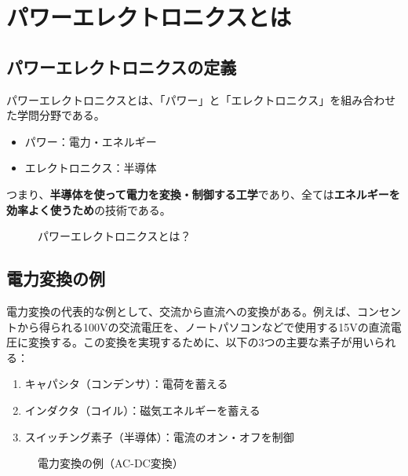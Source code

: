 \section{パワーエレクトロニクスとは}

\subsection{パワーエレクトロニクスの定義}

パワーエレクトロニクスとは、「パワー」と「エレクトロニクス」を組み合わせた学問分野である。

\begin{itemize}
\item パワー：電力・エネルギー
\item エレクトロニクス：半導体
\end{itemize}

つまり、\textbf{半導体を使って電力を変換・制御する工学}であり、全ては\textbf{エネルギーを効率よく使うため}の技術である。

\begin{figure}[H]
\centering
{}
\caption{パワーエレクトロニクスとは？}
\label{fig:what_is_pe}
\end{figure}

\subsection{電力変換の例}

電力変換の代表的な例として、交流から直流への変換がある。例えば、コンセントから得られる100Vの交流電圧を、ノートパソコンなどで使用する15Vの直流電圧に変換する。この変換を実現するために、以下の3つの主要な素子が用いられる：

\begin{enumerate}
\item キャパシタ（コンデンサ）：電荷を蓄える
\item インダクタ（コイル）：磁気エネルギーを蓄える
\item スイッチング素子（半導体）：電流のオン・オフを制御
\end{enumerate}

\begin{figure}[H]
\centering
{}
\caption{電力変換の例（AC-DC変換）}
\label{fig:ac_dc_conversion}
\end{figure}

